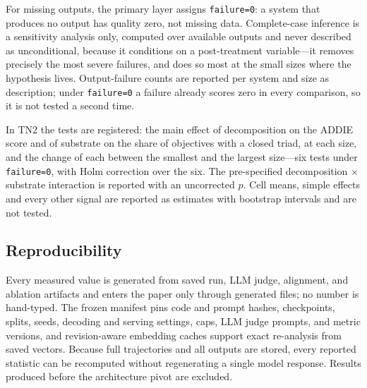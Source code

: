 For missing outputs, the primary layer assigns \texttt{failure=0}: a system that
produces no output has quality zero, not missing data. Complete-case inference is a
sensitivity analysis only, computed over available outputs and never described as
unconditional, because it conditions on a post-treatment variable---it removes
precisely the most severe failures, and does so most at the small sizes where the
hypothesis lives. Output-failure counts are reported per system and size as
description; under \texttt{failure=0} a failure already scores zero in every
comparison, so it is not tested a second time.

In TN2 the tests are registered: the main effect of decomposition on the ADDIE score
and of substrate on the share of objectives with a closed triad, at each size, and
the change of each between the smallest and the largest size---six tests under
\texttt{failure=0}, with Holm correction over the six. The pre-specified
decomposition $\times$ substrate interaction is reported with an uncorrected $p$.
Cell means, simple effects and every other signal are reported as estimates with
bootstrap intervals and are not tested.

\subsection{Reproducibility}
\label{sec:reproducibility}

Every measured value is generated from saved run, LLM judge, alignment, and ablation
artifacts and enters the paper only through generated files; no number is hand-typed.
The frozen manifest pins code and prompt hashes, checkpoints, splits, seeds,
decoding and serving settings, caps, LLM judge prompts, and metric versions, and
revision-aware embedding caches support exact re-analysis from saved vectors.
Because full trajectories and all outputs are stored, every reported statistic can
be recomputed without regenerating a single model response. Results produced before
the architecture pivot are excluded.
